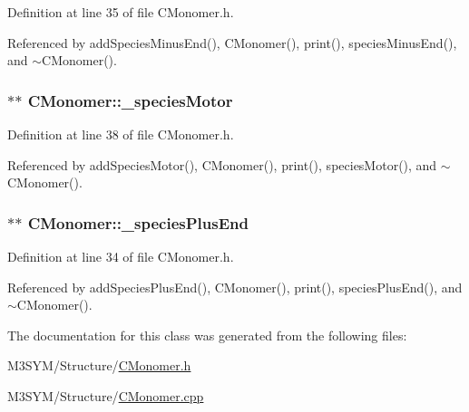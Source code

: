 Definition at line 35 of file C\+Monomer.\+h.



Referenced by add\+Species\+Minus\+End(), C\+Monomer(), print(), species\+Minus\+End(), and $\sim$\+C\+Monomer().

\hypertarget{classCMonomer_af3b42603df2c3e4dff67457bad776fd6}{
\subsubsection[{\+\_\+species\+Motor}]{$\ast$$\ast$ C\+Monomer\+::\+\_\+species\+Motor\hspace{0.3cm}{\ttfamily [private]}}}\label{classCMonomer_af3b42603df2c3e4dff67457bad776fd6}


Definition at line 38 of file C\+Monomer.\+h.



Referenced by add\+Species\+Motor(), C\+Monomer(), print(), species\+Motor(), and $\sim$\+C\+Monomer().

\hypertarget{classCMonomer_a536f3c948c52d79c73fe406048071e7b}{
\subsubsection[{\+\_\+species\+Plus\+End}]{$\ast$$\ast$ C\+Monomer\+::\+\_\+species\+Plus\+End\hspace{0.3cm}{\ttfamily [private]}}}\label{classCMonomer_a536f3c948c52d79c73fe406048071e7b}


Definition at line 34 of file C\+Monomer.\+h.



Referenced by add\+Species\+Plus\+End(), C\+Monomer(), print(), species\+Plus\+End(), and $\sim$\+C\+Monomer().



The documentation for this class was generated from the following files\+:\begin{DoxyCompactItemize}
\item 
M3\+S\+Y\+M/\+Structure/\hyperlink{CMonomer_8h}{C\+Monomer.\+h}\item 
M3\+S\+Y\+M/\+Structure/\hyperlink{CMonomer_8cpp}{C\+Monomer.\+cpp}\end{DoxyCompactItemize}
